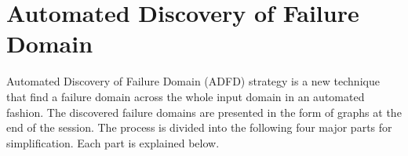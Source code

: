 \documentclass{acm_proc_article-sp}
\begin{document}


\section{Automated Discovery of Failure Domain}\label{sec:adfd}

Automated Discovery of Failure Domain (ADFD) strategy is a new technique that find a failure domain across the whole input domain in an automated fashion. The discovered failure domains are presented in the form of graphs at the end of the session. The process is divided into the following four major parts for simplification. Each part is explained below.
\end{document}
